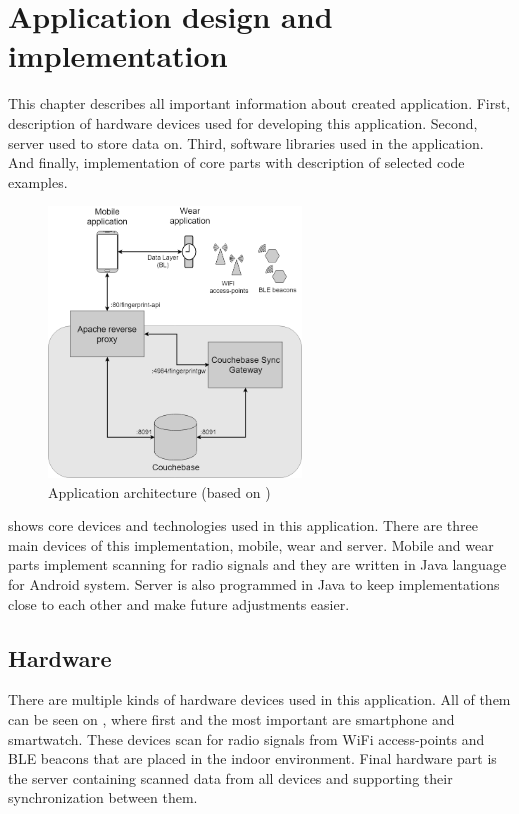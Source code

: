 \chapter{Application design and implementation}\label{sec:ApplicationDesingAndImplementation}
This chapter describes all important information about created application. First, description of hardware devices used for developing this application. Second, server used to store data on. Third, software libraries used in the application. And finally, implementation of core parts with description of selected code examples.

\begin{figure}[H]
	\begin{centering}
		\includegraphics[width=0.6\textwidth]{img/server_architecture}
		\par\end{centering}
	\caption{Application architecture (based on \cite{IILUBLEB})}
	\label{fig01c05}
\end{figure}

 shows core devices and technologies used in this application. There are three main devices of this implementation, mobile, wear and server. Mobile and wear parts implement scanning for radio signals and they are written in Java language for Android system. Server is also programmed in Java to keep implementations close to each other and make future adjustments easier.

\section{Hardware}\label{sec:Hardware}
There are multiple kinds of hardware devices used in this application. All of them can be seen on , where first and the most important are smartphone and smartwatch. These devices scan for radio signals from WiFi access-points and BLE beacons that are placed in the indoor environment. Final hardware part is the server containing scanned data from all devices and supporting their synchronization between them.

